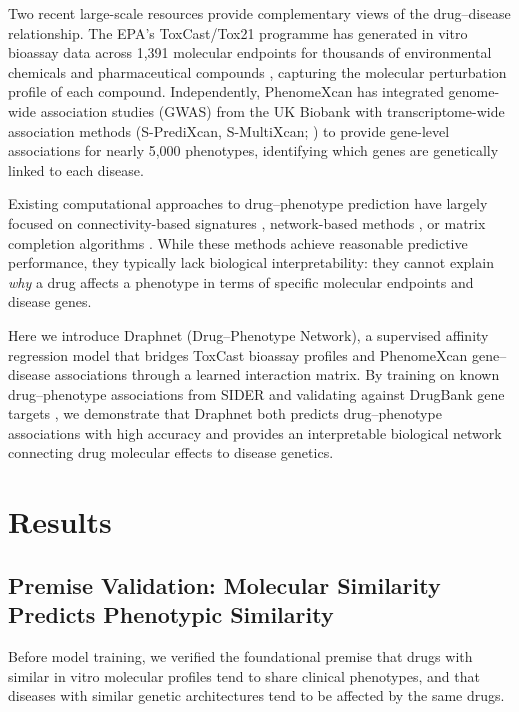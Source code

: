 \documentclass[11pt]{article}
\begin{document}
Two recent large-scale resources provide complementary views of the drug--disease relationship. The EPA's ToxCast/Tox21 programme has generated in vitro bioassay data across 1,391 molecular endpoints for thousands of environmental chemicals and pharmaceutical compounds \citep{richard2016toxcast, houck2009profiling}, capturing the molecular perturbation profile of each compound. Independently, PhenomeXcan \citep{pividori2020phenomexcan} has integrated genome-wide association studies (GWAS) from the UK Biobank \citep{bycroft2018uk} with transcriptome-wide association methods (S-PrediXcan, S-MultiXcan; \citealt{gamazon2015gene, barbeira2018exploring}) to provide gene-level associations for nearly 5,000 phenotypes, identifying which genes are genetically linked to each disease.

Existing computational approaches to drug--phenotype prediction have largely focused on connectivity-based signatures \citep{lamb2006connectivity, subramanian2017next}, network-based methods \citep{cheng2019network, luo2017network}, or matrix completion algorithms \citep{natarajan2014inductive, gottlieb2011predict}. While these methods achieve reasonable predictive performance, they typically lack biological interpretability: they cannot explain \emph{why} a drug affects a phenotype in terms of specific molecular endpoints and disease genes.

Here we introduce Draphnet (Drug--Phenotype Network), a supervised affinity regression model that bridges ToxCast bioassay profiles and PhenomeXcan gene--disease associations through a learned interaction matrix. By training on known drug--phenotype associations from SIDER \citep{kuhn2016sider} and validating against DrugBank gene targets \citep{wishart2018drugbank}, we demonstrate that Draphnet both predicts drug--phenotype associations with high accuracy and provides an interpretable biological network connecting drug molecular effects to disease genetics.

\section{Results}

\subsection{Premise Validation: Molecular Similarity Predicts Phenotypic Similarity}

Before model training, we verified the foundational premise that drugs with similar in vitro molecular profiles tend to share clinical phenotypes, and that diseases with similar genetic architectures tend to be affected by the same drugs.
\end{document}
